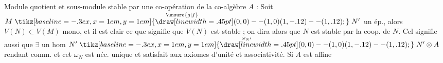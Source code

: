 Module quotient et sous-module stable par une co-opération de la co-algèbre $A$ : Soit $M\overset{\unsure{g|f}}{\mathrel{\tikz[baseline=-.3ex,x=1em,y=1em]{\draw[line width=.45pt] (0,0)--(1,0) (1,-.12)--(1,.12);}}}N'$ un ép., alors $V(N)\subset V(M)$ mono, et il est clair ce que signifie que $V(N)$ est stable ; on dira alors que $N$ est stable par la coop. de $N$. Cel signifie aussi que $\exists$ un hom $N'\overset{\omega_{N'}}{\mathrel{\tikz[baseline=-.3ex,x=1em,y=1em]{\draw[line width=.45pt] (0,0)--(1,0) (1,-.12)--(1,.12);}}}N'\otimes A$ rendant comm.
et cet $\omega_{N}$ est néc. unique et satisfait aux axiomes d'unité et associativité. Si $A$ est  affine
